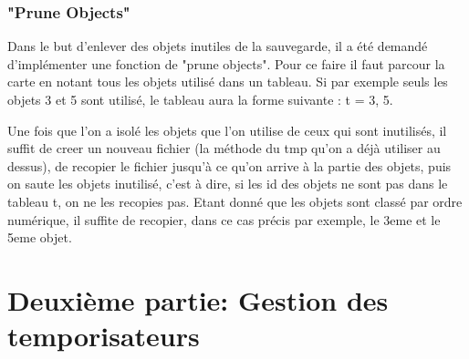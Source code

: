 \documentclass{article}
\begin{document}
\subsubsection{"Prune Objects"}
Dans le but d'enlever des objets inutiles de la sauvegarde, il a été demandé d'implémenter une fonction de "prune objects". Pour ce faire il faut parcour la carte en notant tous les objets utilisé dans un tableau. Si par exemple seuls les objets 3 et 5 sont utilisé, le tableau aura la forme suivante : t = {3, 5}.

Une fois que l'on a isolé les objets que l'on utilise de ceux qui sont inutilisés, il suffit de creer un nouveau fichier (la méthode du tmp qu'on a déjà utiliser au dessus), de recopier le fichier jusqu'à ce qu'on arrive à la partie des objets, puis on saute les objets inutilisé, c'est à dire, si les id des objets ne sont pas dans le tableau t, on ne les recopies pas. Etant donné que les objets sont classé par ordre numérique, il suffite de recopier, dans ce cas précis par exemple, le 3eme et le 5eme objet.


\newpage
\section{Deuxième partie: Gestion des temporisateurs}
\end{document}
